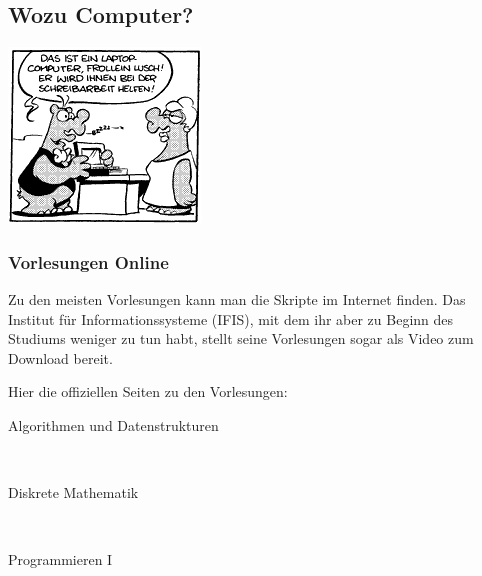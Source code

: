 \subsection{Wozu Computer?}
 \begin{center}
 \includegraphics[width = 0.75\linewidth]{bilder/comics/otto1_1.png}
 \end{center}
\subsubsection{Vorlesungen Online}
Zu den meisten Vorlesungen kann man die Skripte im Internet finden. Das Institut 
für Informationssysteme (IFIS), mit dem ihr aber zu Beginn des Studiums 
weniger zu tun habt, stellt seine Vorlesungen sogar als Video zum Download bereit.

Hier die offiziellen Seiten zu den Vorlesungen:

\begin{description}
\item[Algorithmen und Datenstrukturen]~\\
{\footnotesize{}}
\item[Diskrete Mathematik]~\\
{\footnotesize{}}
\item[Programmieren I]~\\
{\footnotesize{}}
\end{description}

